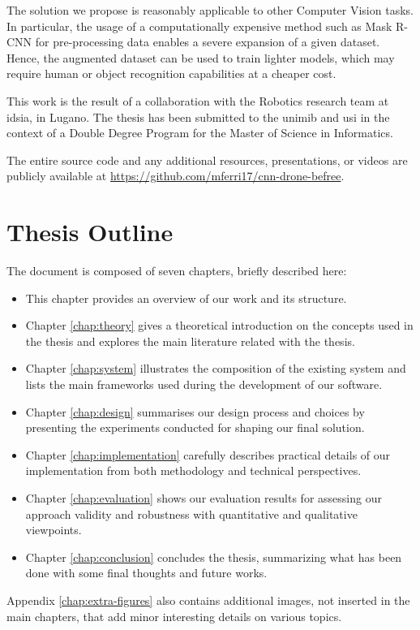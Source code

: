 \medskip

The solution we propose is reasonably applicable to other Computer Vision tasks. In particular, the usage of a computationally expensive method such as Mask R-CNN for pre-processing data enables a severe expansion of a given dataset. Hence, the augmented dataset can be used to train lighter models, which may require human or object recognition capabilities at a cheaper cost.

\clearpage

This work is the result of a collaboration with the Robotics research team at \gls{idsia}, in Lugano. The thesis has been submitted to the \gls{unimib} and \gls{usi} in the context of a Double Degree Program for the Master of Science in Informatics.

The entire source code and any additional resources, presentations, or videos are publicly available at \url{https://github.com/mferri17/cnn-drone-befree}.




\section*{Thesis Outline}
\label{sec:outline}

The document is composed of seven chapters, briefly described here:

\begin{itemize}
	\item This chapter provides an overview of our work and its structure.
	\item Chapter \ref{chap:theory} gives a theoretical introduction on the concepts used in the thesis and explores the main literature related with the thesis.
	\item Chapter \ref{chap:system} illustrates the composition of the existing system and lists the main frameworks used during the development of our software.
	\item Chapter \ref{chap:design} summarises our design process and choices by presenting the experiments conducted for shaping our final solution.
	\item Chapter \ref{chap:implementation} carefully describes practical details of our implementation from both methodology and technical perspectives.
	\item Chapter \ref{chap:evaluation} shows our evaluation results for assessing our approach validity and robustness with quantitative and qualitative viewpoints.
	\item Chapter \ref{chap:conclusion} concludes the thesis, summarizing what has been done with some final thoughts and future works.
\end{itemize}

Appendix \ref{chap:extra-figures} also contains additional images, not inserted in the main chapters, that add minor interesting details on various topics.





